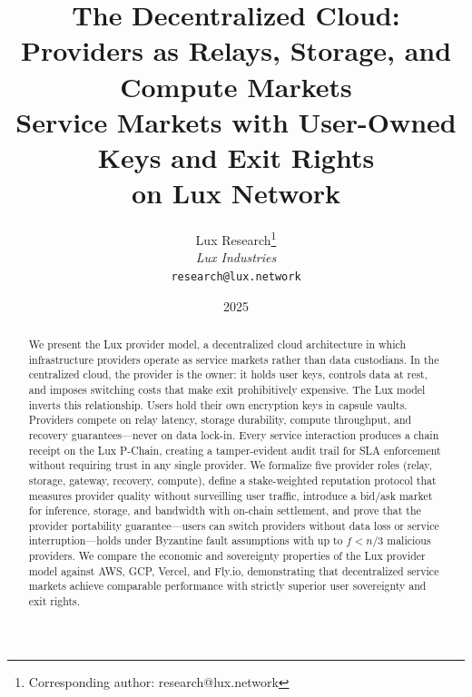 \documentclass[11pt,a4paper]{article}
\title{\textbf{The Decentralized Cloud: Providers as Relays, Storage, and Compute Markets}\\[6pt]
\large Service Markets with User-Owned Keys and Exit Rights\\on Lux Network}
\author{
Lux Research\thanks{Corresponding author: research@lux.network}\\
\textit{Lux Industries}\\
\texttt{research@lux.network}
}
\date{2025}
\begin{document}
\luxcoverpage

\begin{abstract}
We present the Lux provider model, a decentralized cloud architecture in which
infrastructure providers operate as service markets rather than data custodians.
In the centralized cloud, the provider is the owner: it holds user keys, controls
data at rest, and imposes switching costs that make exit prohibitively expensive.
The Lux model inverts this relationship. Users hold their own encryption keys in
capsule vaults. Providers compete on relay latency, storage durability, compute
throughput, and recovery guarantees---never on data lock-in. Every service
interaction produces a chain receipt on the Lux P-Chain, creating a tamper-evident
audit trail for SLA enforcement without requiring trust in any single provider.
We formalize five provider roles (relay, storage, gateway, recovery, compute),
define a stake-weighted reputation protocol that measures provider quality without
surveilling user traffic, introduce a bid/ask market for inference, storage, and
bandwidth with on-chain settlement, and prove that the provider portability
guarantee---users can switch providers without data loss or service interruption---holds
under Byzantine fault assumptions with up to $f < n/3$ malicious providers. We
compare the economic and sovereignty properties of the Lux provider model against
AWS, GCP, Vercel, and Fly.io, demonstrating that decentralized service markets
achieve comparable performance with strictly superior user sovereignty and exit rights.
\end{abstract}











\end{document}
